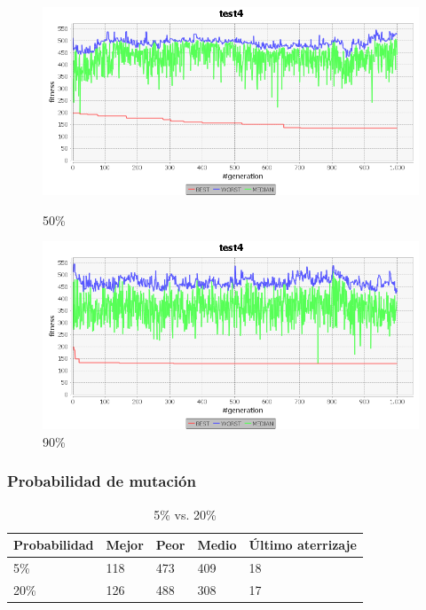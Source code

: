 \documentclass[a4paper,12pt,titlepage]{article}
\begin{document}
\begin{figure}[!ht]
\centering
\begin{minipage}{.5\textwidth}
  \centering
  \includegraphics[width=\textwidth]{50cruce.png}
  \caption{50\%}
\end{minipage}%
\begin{minipage}{.5\textwidth}
  \centering
  \includegraphics[width=\textwidth]{90cruce.png}
  \caption{90\%}
\end{minipage}
\end{figure}

\subsubsection{Probabilidad de mutación}

\begin{table}[!ht]
\centering
\begin{tabular}{@{}lllll@{}}
\toprule
Probabilidad & Mejor & Peor & Medio & Último aterrizaje \\ \midrule
5\%          & 118   & 473  & 409   & 18                \\
20\%         & 126   & 488  & 308   & 17                \\ \bottomrule
\end{tabular}
\caption{5\% vs. 20\%}
\end{table}
\end{document}
